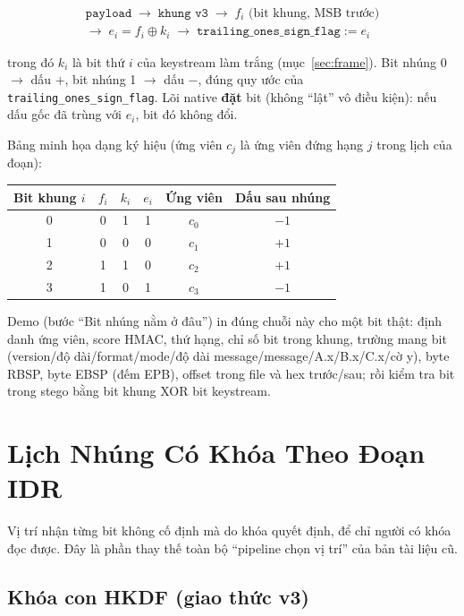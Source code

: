 \documentclass[11pt,a4paper]{article}
\begin{document}
\begin{gather*}
  \texttt{payload}
  \;\rightarrow\;
  \texttt{khung v3}
  \;\rightarrow\;
  f_i \text{ (bit khung, MSB trước)} \\
  \rightarrow\;
  e_i = f_i \oplus k_i
  \;\rightarrow\;
  \texttt{trailing\_ones\_sign\_flag} := e_i
\end{gather*}

trong đó \(k_i\) là bit thứ \(i\) của keystream làm trắng (mục~\ref{sec:frame}).
Bit nhúng 0 \(\rightarrow\) dấu \(+\), bit nhúng 1 \(\rightarrow\) dấu \(-\),
đúng quy ước của \texttt{trailing\_ones\_sign\_flag}. Lõi native \textbf{đặt} bit
(không ``lật'' vô điều kiện): nếu dấu gốc đã trùng với \(e_i\), bit đó không đổi.

Bảng minh họa dạng ký hiệu (ứng viên \(c_j\) là ứng viên đứng hạng \(j\) trong lịch
của đoạn):

\begin{center}
\begin{tabular}{cccccc}
\toprule
Bit khung \(i\) & \(f_i\) & \(k_i\) & \(e_i\) & Ứng viên & Dấu sau nhúng \\
\midrule
0 & 0 & 1 & 1 & \(c_0\) & \(-1\) \\
1 & 0 & 0 & 0 & \(c_1\) & \(+1\) \\
2 & 1 & 1 & 0 & \(c_2\) & \(+1\) \\
3 & 1 & 0 & 1 & \(c_3\) & \(-1\) \\
\bottomrule
\end{tabular}
\end{center}

Demo (bước ``Bit nhúng nằm ở đâu'') in đúng chuỗi này cho một bit thật: định danh
ứng viên, score HMAC, thứ hạng, chỉ số bit trong khung, trường mang bit
(version/độ dài/format/mode/độ dài message/message/A.x/B.x/C.x/cờ y), byte RBSP,
byte EBSP (đếm EPB), offset
trong file và hex trước/sau; rồi kiểm tra bit trong stego bằng bit khung XOR bit
keystream.

\section{Lịch Nhúng Có Khóa Theo Đoạn IDR}
\label{sec:schedule}

Vị trí nhận từng bit không cố định mà do khóa quyết định, để chỉ người có khóa đọc
được. Đây là phần thay thế toàn bộ ``pipeline chọn vị trí'' của bản tài liệu cũ.

\subsection{Khóa con HKDF (giao thức v3)}
\end{document}
